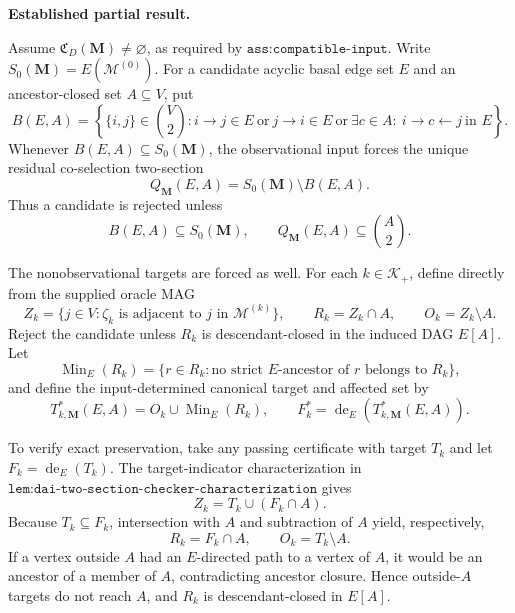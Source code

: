 \textbf{Established partial result.}

Assume \(\mathfrak C_D(\mathbf M)\ne\varnothing\), as required by \(\texttt{ass:compatible-input}\).  Write \(S_0(\mathbf M)=E(\mathcal M^{(0)})\).  For a candidate acyclic basal edge set \(E\) and an ancestor-closed set \(A\subseteq V\), put
\[
B(E,A)=\left\{\{i,j\}\in\binom V2:
i\to j\in E\ \text{or}\ j\to i\in E\ \text{or}\
\exists c\in A:\ i\to c\leftarrow j\ \text{in }E
\right\}.
\]
Whenever \(B(E,A)\subseteq S_0(\mathbf M)\), the observational input forces the unique residual co-selection two-section
\[
Q_{\mathbf M}(E,A)=S_0(\mathbf M)\setminus B(E,A).
\]
Thus a candidate is rejected unless
\[
B(E,A)\subseteq S_0(\mathbf M),
\qquad
Q_{\mathbf M}(E,A)\subseteq\binom A2.
\]

The nonobservational targets are forced as well.  For each \(k\in\mathcal K_+\), define directly from the supplied oracle MAG
\[
Z_k=\{j\in V:\zeta_k\text{ is adjacent to }j\text{ in }\mathcal M^{(k)}\},
\qquad
R_k=Z_k\cap A,
\qquad
O_k=Z_k\setminus A.
\]
Reject the candidate unless \(R_k\) is descendant-closed in the induced DAG \(E[A]\).  Let
\[
\operatorname{Min}_E(R_k)
=\{r\in R_k:\text{no strict }E\text{-ancestor of }r\text{ belongs to }R_k\},
\]
and define the input-determined canonical target and affected set by
\[
T^{*}_{k,\mathbf M}(E,A)=O_k\cup\operatorname{Min}_E(R_k),
\qquad
F_k^{*}=\operatorname{de}_E\!\left(T^{*}_{k,\mathbf M}(E,A)\right).
\]

To verify exact preservation, take any passing certificate with target \(T_k\) and let \(F_k=\operatorname{de}_E(T_k)\).  The target-indicator characterization in \(\texttt{lem:dai-two-section-checker-characterization}\) gives
\[
Z_k=T_k\cup(F_k\cap A).
\]
Because \(T_k\subseteq F_k\), intersection with \(A\) and subtraction of \(A\) yield, respectively,
\[
R_k=F_k\cap A,
\qquad
O_k=T_k\setminus A.
\]
If a vertex outside \(A\) had an \(E\)-directed path to a vertex of \(A\), it would be an ancestor of a member of \(A\), contradicting ancestor closure.  Hence outside-\(A\) targets do not reach \(A\), and \(R_k\) is descendant-closed in \(E[A]\).

